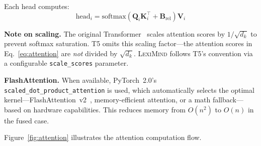 \documentclass[11pt,a4paper]{article}
\newcommand{\lexiname}{\textsc{LexiMind}}
\newcommand{\softmax}{\text{softmax}}
\begin{document}
Each head computes:
\begin{equation}
\label{eq:attention}
    \text{head}_i = \softmax\!\left(\bm{Q}_i \bm{K}_i^\top + \bm{B}_\text{rel}\right) \bm{V}_i
\end{equation}

\textbf{Note on scaling.}
The original Transformer~\citep{vaswani2017attention} scales attention scores by $1/\sqrt{d_k}$ to prevent softmax saturation.
T5 omits this scaling factor---the attention scores in Eq.~\eqref{eq:attention} are \emph{not} divided by $\sqrt{d_k}$.
\lexiname{} follows T5's convention via a configurable \texttt{scale\_scores} parameter.

\textbf{FlashAttention.}
When available, PyTorch~2.0's \texttt{scaled\_dot\_product\_attention} is used, which automatically selects the optimal kernel---FlashAttention~v2~\citep{dao2022flashattention}, memory-efficient attention, or a math fallback---based on hardware capabilities.
This reduces memory from $O(n^2)$ to $O(n)$ in the fused case.

Figure~\ref{fig:attention} illustrates the attention computation flow.
\end{document}
